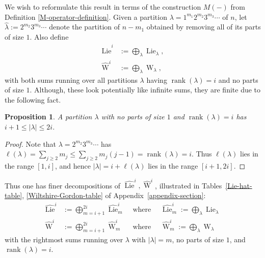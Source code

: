 \documentclass[12pt]{amsart}
\theoremstyle{plain}
\newtheorem{prop}[thm]{Proposition}
\theoremstyle{definition}
\begin{document}
We wish to reformulate this result in terms of the construction $M(-)$ from Definition
\eqref{M-operator-definition}.  Given a partition
$\lambda=1^{m_1} 2^{m_2} 3^{m_3} \cdots$ of $n$,
let  
$
\hat{\lambda}:= 2^{m_2} 3^{m_3} \cdots
$
denote the partition of $n-m_1$ obtained by removing all of its parts of size $1$.
Also define
$$
\begin{aligned}
 \widehat{{\operatorname{Lie}}}^i &:= \bigoplus_{\lambda} {{\operatorname{Lie}}}_\lambda,\\
\widehat{{\operatorname{W}}}^i  &:=\bigoplus_{\lambda} {{\operatorname{W}}}_\lambda,
\end{aligned}
$$
with both sums running over all partitions  $\lambda$ 
having ${{\operatorname{rank}}}(\lambda)=i$ and no parts of size $1$.  Although, these look potentially
like infinite sums, they are finite due to the following fact.

\begin{prop}
\label{bounds-on-derangement-size-prop} 
A partition $\lambda$ with no parts of size $1$ and ${{\operatorname{rank}}}(\lambda)=i$ has
$i+1 \leq |\lambda| \leq 2i$.
\end{prop}
\begin{proof}
Note that $\lambda=2^{m_2} 3^{m_3} \cdots$ has 
$
\ell(\lambda)
=\sum_{j \geq 2}m_j
\leq \sum_{j \geq 2}m_j(j-1)
={{\operatorname{rank}}}(\lambda)
=i.
$
Thus $\ell(\lambda)$ lies in the range $[1,i]$,
and hence 
$|\lambda|=i+\ell(\lambda)$ lies in the range $[i+1,2i]$.
\end{proof}

\noindent
Thus one has finer decompositions of 
$\widehat{{\operatorname{Lie}}}^i, \widehat{{\operatorname{W}}}^i$, illustrated in
Tables~\eqref{Lie-hat-table}, \eqref{Wiltshire-Gordon-table} of
Appendix~\ref{appendix-section}:
\begin{equation}
\label{definition-of-finer-hats}
\begin{array}{rll}
 \widehat{{\operatorname{Lie}}}^i 
  &:= \displaystyle\bigoplus_{m=i+1}^{2i} \widehat{{\operatorname{Lie}}}^i_m
  & \text{ where }\quad 
    \displaystyle\widehat{{\operatorname{Lie}}}^i_m
         :=\bigoplus_{\lambda} {{\operatorname{Lie}}}_\lambda 
\\
 \widehat{{\operatorname{W}}}^i 
  &:= \displaystyle\bigoplus_{m=i+1}^{2i} \widehat{{\operatorname{W}}}^i_m
  & \text{ where }\quad 
    \displaystyle\widehat{{\operatorname{W}}}^i_m
         :=\bigoplus_{\lambda} {{\operatorname{W}}}_\lambda 
\end{array}
\end{equation}
with the rightmost sums running over $\lambda$ with $|\lambda|=m$,
no parts of size $1$, and ${{\operatorname{rank}}}(\lambda)=i$.
\end{document}
